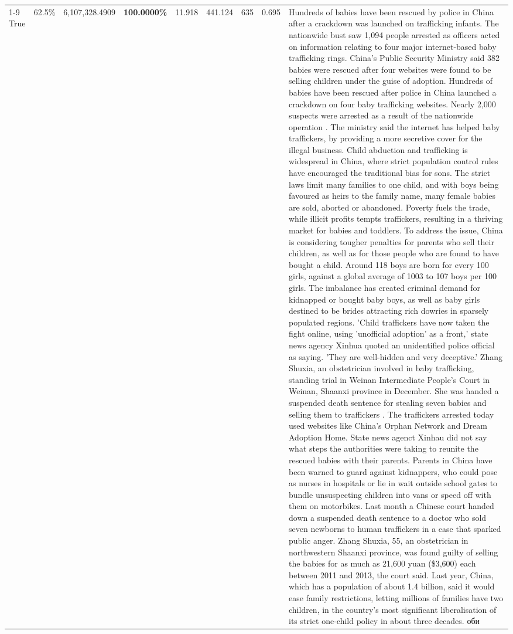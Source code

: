 \begin{table}[H]
\begin{tabular}{lllrlllll}
\cline{1-9}
True & 62.5\% & 6,107,328.4909 & \bfseries \color{red} 100.0000\% & 11.918 & 441.124 & 635 & 0.695 & Hundreds of babies have been rescued by police in China after a crackdown was launched on trafficking infants. The nationwide bust saw 1,094 people arrested as officers acted on information relating to four major internet-based baby trafficking rings. China's Public Security Ministry said 382 babies were rescued after four websites were found to be selling children under the guise of adoption. Hundreds of babies have been rescued after police in China launched a crackdown on four baby trafficking websites. Nearly 2,000 suspects were arrested as a result of the nationwide operation . The ministry said the internet has helped baby traffickers, by providing a more secretive cover for the illegal business. Child abduction and trafficking is widespread in China, where strict population control rules have encouraged the traditional bias for sons. The strict laws limit many families to one child, and with boys being favoured as heirs to the family name, many female babies are sold, aborted or abandoned. Poverty fuels the trade, while illicit profits tempts traffickers, resulting in a thriving market for babies and toddlers. To address the issue, China is considering tougher penalties for parents who sell their children, as well as for those people who are found to have bought a child. Around 118 boys are born for every 100 girls, against a global average of 1003 to 107 boys per 100 girls. The imbalance has created criminal demand for kidnapped or bought baby boys, as well as baby girls destined to be brides attracting rich dowries in sparsely populated regions. 'Child traffickers have now taken the fight online, using 'unofficial adoption' as a front,' state news agency Xinhua quoted an unidentified police official as saying. 'They are well-hidden and very deceptive.' Zhang Shuxia, an obstetrician involved in baby trafficking, standing trial in Weinan Intermediate People's Court in Weinan, Shaanxi province in December. She was handed a suspended death sentence for stealing seven babies and selling them to traffickers . The traffickers arrested today used websites like China's Orphan Network and Dream Adoption Home. State news agenct Xinhau did not say what steps the authorities were taking to reunite the rescued babies with their parents. Parents in China have been warned to guard against kidnappers, who could pose as nurses in hospitals or lie in wait outside school gates to bundle unsuspecting children into vans or speed off with them on motorbikes. Last month a Chinese court handed down a suspended death sentence to a doctor who sold seven newborns to human traffickers in a case that sparked public anger. Zhang Shuxia, 55, an obstetrician in northwestern Shaanxi province, was found guilty of selling the babies for as much as 21,600 yuan (\$3,600) each between 2011 and 2013, the court said. Last year, China, which has a population of about 1.4 billion, said it would ease family restrictions, letting millions of families have two children, in the country's most significant liberalisation of its strict one-child policy in about three decades. оби \\

\end{tabular}
\end{table}
